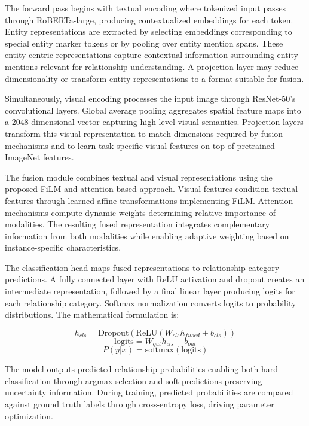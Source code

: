 \documentclass[12pt,a4paper]{report}
\begin{document}
The forward pass begins with textual encoding where tokenized input passes through RoBERTa-large, producing contextualized embeddings for each token. Entity representations are extracted by selecting embeddings corresponding to special entity marker tokens or by pooling over entity mention spans. These entity-centric representations capture contextual information surrounding entity mentions relevant for relationship understanding. A projection layer may reduce dimensionality or transform entity representations to a format suitable for fusion.

Simultaneously, visual encoding processes the input image through ResNet-50's convolutional layers. Global average pooling aggregates spatial feature maps into a 2048-dimensional vector capturing high-level visual semantics. Projection layers transform this visual representation to match dimensions required by fusion mechanisms and to learn task-specific visual features on top of pretrained ImageNet features.

The fusion module combines textual and visual representations using the proposed FiLM and attention-based approach. Visual features condition textual features through learned affine transformations implementing FiLM. Attention mechanisms compute dynamic weights determining relative importance of modalities. The resulting fused representation integrates complementary information from both modalities while enabling adaptive weighting based on instance-specific characteristics.

The classification head maps fused representations to relationship category predictions. A fully connected layer with ReLU activation and dropout creates an intermediate representation, followed by a final linear layer producing logits for each relationship category. Softmax normalization converts logits to probability distributions. The mathematical formulation is:

\begin{equation}
h_{cls} = \text{Dropout}(\text{ReLU}(W_{cls} h_{fused} + b_{cls}))
\end{equation}
\begin{equation}
\text{logits} = W_{out} h_{cls} + b_{out}
\end{equation}
\begin{equation}
P(y|x) = \text{softmax}(\text{logits})
\end{equation}

The model outputs predicted relationship probabilities enabling both hard classification through argmax selection and soft predictions preserving uncertainty information. During training, predicted probabilities are compared against ground truth labels through cross-entropy loss, driving parameter optimization.
\end{document}
